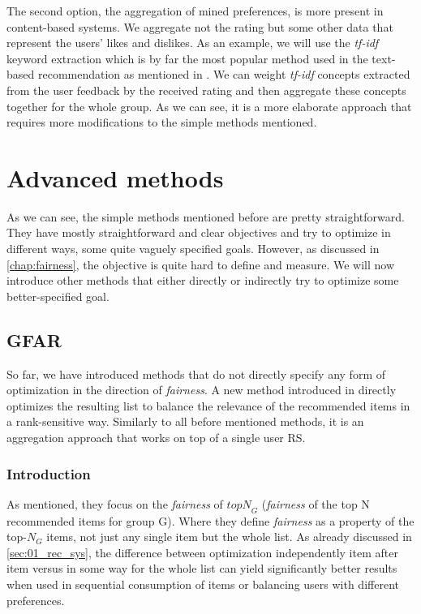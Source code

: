 The second option, the aggregation of mined preferences, is more present in content-based systems. We aggregate not the rating but some other data that represent the users' likes and dislikes. As an example, we will use the \textit{tf-idf} keyword extraction which is by far the most popular method used in the text-based recommendation as mentioned in \cite{beel_2016_rs_literature_survey}. We can weight \textit{tf-idf} concepts extracted from the user feedback by the received rating and then aggregate these concepts together for the whole group. As we can see, it is a more elaborate approach that requires more modifications to the simple methods mentioned.



\section{Advanced methods}\label{sec:03_advanced_methods}
As we can see, the simple methods mentioned before are pretty straightforward. They have mostly straightforward and clear objectives and try to optimize in different ways, some quite vaguely specified goals. However, as discussed in \ref{chap:fairness}, the objective is quite hard to define and measure. We will now introduce other methods that either directly or indirectly try to optimize some better-specified goal.

\subsection{GFAR} \label{subsec:03_advanced_methods.gfar}
So far, we have introduced methods that do not directly specify any form of optimization in the direction of \textit{fairness}. A new method introduced in\cite{GFAR-kaya2020} directly optimizes the resulting list to balance the relevance of the recommended items in a rank-sensitive way. Similarly to all before mentioned methods, it is an aggregation approach that works on top of a single user RS.

\subsubsection{Introduction}

As mentioned, they focus on the \textit{fairness} of $\mathit{topN}_G$ (\textit{fairness} of the top N recommended items for group G). Where they define \textit{fairness} as a property of the top-$N_G$ items, not just any single item but the whole list. As already discussed in \ref{sec:01_rec_sys}, the difference between optimization independently item after item versus in some way for the whole list can yield significantly better results when used in sequential consumption of items or balancing users with different preferences.

